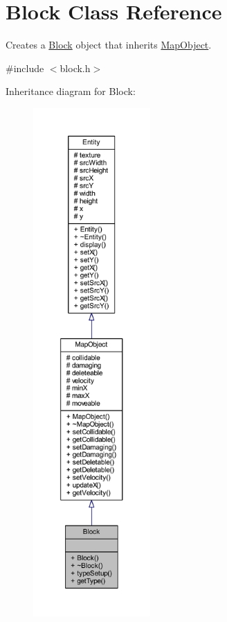 \hypertarget{class_block}{\section{Block Class Reference}
\label{class_block}
}


Creates a \hyperlink{class_block}{Block} object that inherits \hyperlink{class_map_object}{Map\+Object}.  




{\ttfamily \#include $<$block.\+h$>$}



Inheritance diagram for Block\+:
\nopagebreak
\begin{figure}[H]
\begin{center}
\leavevmode
\includegraphics[height=550pt]{class_block__inherit__graph}
\end{center}
\end{figure}


